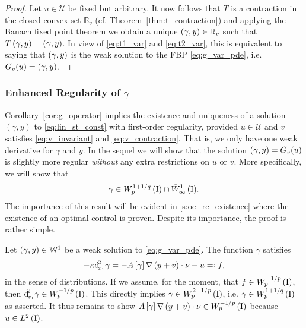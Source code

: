 \documentclass[final]{siamltex}
\begin{document}
\begin{proof} Let $u \in {\mathcal{U}}$ be fixed but arbitrary. It now follows that $T$ is a contraction in the closed convex set ${\mathbb{B}}_v$ (cf. Theorem~\ref{thm:t_contraction}) and applying the Banach fixed point theorem we obtain a unique $\del{\gamma,y} \in {\mathbb{B}}_v$ such that $T\del{\gamma, y} = \del{\gamma,y}$. In view of \eqref{eq:t1_var} and \eqref{eq:t2_var}, this is equivalent to saying that $\del{\gamma,y}$ is the weak solution to the FBP \eqref{eq:g_var_pde}, i.e. $G_v(u) = \del{\gamma,y}$.
\end{proof}

\subsubsection{Enhanced Regularity of $\gamma$}
\label{s:g_intepolation}
Corollary~\ref{cor:g_operator} implies  the existence and uniqueness of a solution $(\gamma,y)$ to \eqref{eq:lin_st_const} with first-order regularity, provided $u\in {\mathcal{U}}$ and $v$ satisfies 
\eqref{eq:v_invariant} and \eqref{eq:v_contraction}. That is,  we only have one weak derivative for $\gamma$ and $y$.  
In the sequel we will show that the solution $\del{\gamma,y} = G_v(u)$ is slightly more regular \emph{without} any extra restrictions on $u$ or $v$. More specifically, we will show that 
	\begin{equation}\label{eq:gamma_enhanced_regularity}
		\gamma \in {{W^{{1+1/q}}_{{p}}\del{\text{\rm I}}}} \cap {{\mathring{W}^{1}_{\infty}\del{{\text{\rm I}}}}}. 
	\end{equation}
The importance of this result will be evident in \autoref{s:oc_rc_existence} where the existence of an optimal control is proven.  Despite its importance, the proof is rather simple. 

Let $\del{\gamma, y} \in {\mathbb{W}}^1$ be a weak solution to \eqref{eq:g_var_pde}. The function $\gamma$ satisfies
\[
	-\kappa {\operatorname{d}\!}^2_{x_1}\gamma = {-A\sbr{\gamma}{\nabla}\del{y+v}\cdot\nu + u} =: f ,
\]
in the sense of distributions. 
If we assume, for the moment, that $f \in {{W^{{-1/p}}_{{p}}\del{\text{\rm I}}}}$, then
${\operatorname{d}\!}^2_{x_1}\gamma \in {{W^{{-1/p}}_{{p}}\del{\text{\rm I}}}}$. This directly implies
$\gamma \in {{W^{{2-1/p}}_{{p}}\del{\text{\rm I}}}}$, i.e. $\gamma \in {{W^{{1+1/q}}_{p}\del{\text{\rm I}}}}$ as
asserted. It thus remains to show 
$A\sbr{\gamma}{\nabla}\del{y+v}\cdot\nu\in{{W^{{-1/p}}_{{p}}\del{\text{\rm I}}}}$ because
$u \in {{L^2\del{{\text{\rm I}}}}}$. 
\end{document}
